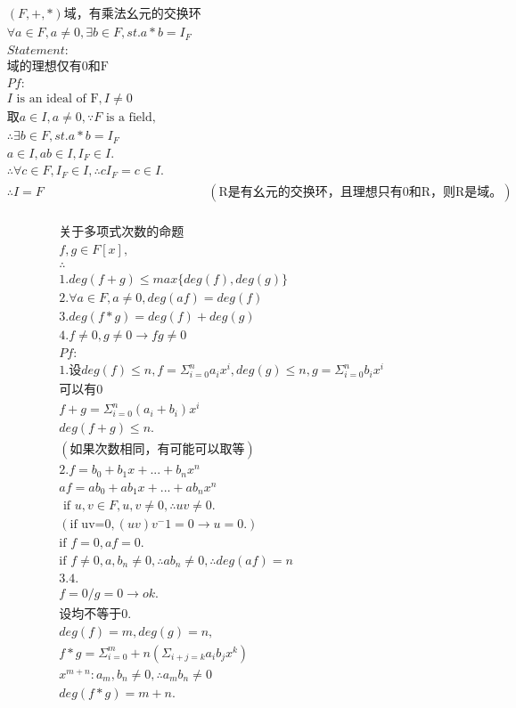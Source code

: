 \documentclass[12pt, a4paper]{article}  %
\begin{document}
\begin{align}
    &(F,+,*)\text{域，有乘法幺元的交换环}\\
    &\forall a\in F,a\neq 0,\exists b\in F,st. a*b=I_F\\
    &Statement:\\
    &\text{域的理想仅有{0}和{F}}\\
    &Pf:\\
    &I\text{ is an ideal of F},I\neq {0}\\
    &\text{取}a\in I,a\neq 0,\because F\text{ is a field},\\
    &\therefore \exists b\in F,st. a*b=I_F\\
    &a\in I,ab\in I,I_F\in I.\\
    &\therefore \forall c\in F,I_F\in I,\therefore cI_F=c\in I.\\
    &\therefore I=F
    &(\text{R是有幺元的交换环，且理想只有{0}和R，则R是域。})\\
\end{align}

\begin{align}
    &\text{关于多项式次数的命题}\\
    &f,g\in F[x],\\
    &\therefore\\
    &1.deg(f+g)\leqslant max\{deg(f),deg(g)\}\\
    &2.\forall a\in F,a\neq 0,deg(af)=deg(f)\\
    &3.deg(f*g)=deg(f)+deg(g)\\
    &4.f\neq 0,g\neq 0\rightarrow fg\neq 0\\
    &Pf:\\
    &1.\text{设}deg(f)\leqslant n,f=\Sigma_{i=0}^n a_i x^i,deg(g)\leqslant n,g=\Sigma_{i=0}^n b_i x^i\\
    &\text{可以有0}\\
    &f+g=\Sigma_{i=0}^n (a_i+b_i) x^i\\
    &deg(f+g)\leqslant n.\\
    &(\text{如果次数相同，有可能可以取等})\\
    &2.f=b_0+b_1x+...+b_nx^n\\
    &af=ab_0+ab_1x+...+ab_nx^n\\
    &\text{ if }u,v\in F,u,v\neq 0,\therefore uv\neq 0.\\
    &(\text{if uv=0},(uv)v^-1=0\rightarrow u=0.)\\
    &\text{if }f=0,af=0.\\
    &\text{if }f\neq 0,a,b_n\neq 0,\therefore ab_n \neq 0,\therefore deg(af)=n\\
    &3.4.\\
    &f=0/g=0\rightarrow ok.\\
    &\text{设均不等于0}.\\
    &deg(f)=m,deg(g)=n,\\
    &f*g=\Sigma_{i=0}^m+n (\Sigma_{i+j=k} a_i b_j x^{k})\\
    &x^{m+n}:a_m,b_n\neq 0,\therefore a_mb_n\neq 0\\
    &deg(f*g)=m+n.\\
\end{align}
\end{document}
